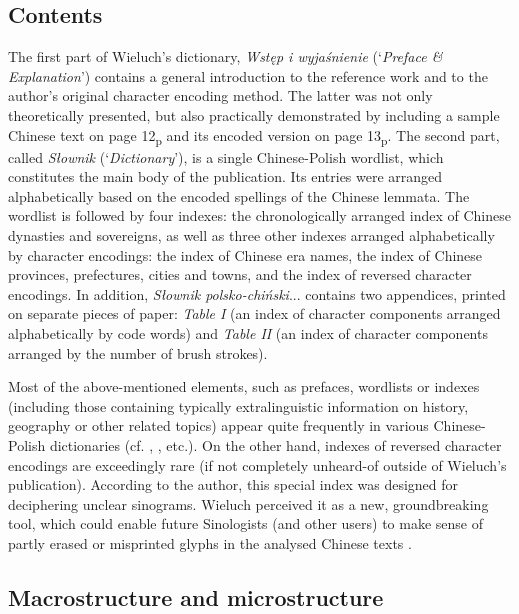 \documentclass[output=paper,colorlinks,citecolor=brown,arabicfont,chinesefont]{langscibook}
\begin{document}
\subsection{Contents}

The first part of Wieluch's dictionary, \emph{Wstęp i wyjaśnienie} (‘\emph{Preface \& Explanation}’) contains a general introduction to the reference work and to the author's original character encoding method. The latter was not only theoretically presented, but also practically demonstrated by including a sample Chinese text on page 12\textsubscript{p} and its encoded version on page 13\textsubscript{p}. The second part, called \emph{Słownik} (‘\emph{Dictionary}’), is a single Chinese-Polish wordlist, which constitutes the main body of the publication. Its entries were arranged alphabetically based on the encoded spellings of the Chinese lemmata. The wordlist is followed by four indexes: the chronologically arranged index of Chinese dynasties and sovereigns, as well as three other indexes arranged alphabetically by character encodings: the index of Chinese era names, the index of Chinese provinces, prefectures, cities and towns, and the index of reversed character encodings. In addition, \emph{Słownik polsko-chiński}... contains two appendices, printed on separate pieces of paper: \emph{Table I} (an index of character components arranged alphabetically by code words) and \emph{Table II} (an index of character components arranged by the number of brush strokes). 

Most of the above-mentioned elements, such as prefaces, wordlists or indexes (including those containing typically extralinguistic information on history, geography or other related topics) appear quite frequently in various Chinese-Polish dictionaries (cf. \citealt{XuYao_2010},  \citealt{Kocyba-grychKolecka2012}, etc.). On the other hand, indexes of reversed character encodings are exceedingly rare (if not completely unheard-of outside of Wieluch's publication). According to the author, this special index was designed for deciphering unclear sinograms. Wieluch perceived it as a new, groundbreaking tool, which could enable future Sinologists (and other users) to make sense of partly erased or misprinted glyphs in the analysed Chinese texts \citep[14\textsubscript{p}]{Wieluch1936}.

\subsection{Macrostructure and microstructure}
\end{document}
